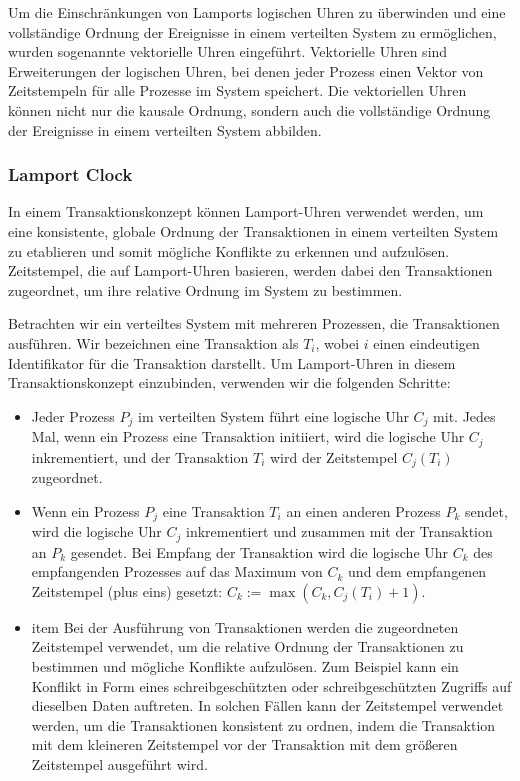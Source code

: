 Um die Einschränkungen von Lamports logischen Uhren zu überwinden und eine vollständige Ordnung der Ereignisse in einem verteilten System zu ermöglichen, wurden sogenannte vektorielle Uhren eingeführt. Vektorielle Uhren sind Erweiterungen der logischen Uhren, bei denen jeder Prozess einen Vektor von Zeitstempeln für alle Prozesse im System speichert. Die vektoriellen Uhren können nicht nur die kausale Ordnung, sondern auch die vollständige Ordnung der Ereignisse in einem verteilten System abbilden.

\subsubsection{Lamport Clock}
In einem Transaktionskonzept können Lamport-Uhren verwendet werden, um eine konsistente, globale Ordnung der Transaktionen in einem verteilten System zu etablieren und somit mögliche Konflikte zu erkennen und aufzulösen. Zeitstempel, die auf Lamport-Uhren basieren, werden dabei den Transaktionen zugeordnet, um ihre relative Ordnung im System zu bestimmen.

Betrachten wir ein verteiltes System mit mehreren Prozessen, die Transaktionen ausführen. Wir bezeichnen eine Transaktion als $T_i$, wobei $i$ einen eindeutigen Identifikator für die Transaktion darstellt. Um Lamport-Uhren in diesem Transaktionskonzept einzubinden, verwenden wir die folgenden Schritte:
\begin{itemize}
\item Jeder Prozess $P_j$ im verteilten System führt eine logische Uhr $C_j$ mit. Jedes Mal, wenn ein Prozess eine Transaktion initiiert, wird die logische Uhr $C_j$ inkrementiert, und der Transaktion $T_i$ wird der Zeitstempel $C_j(T_i)$ zugeordnet.

\item Wenn ein Prozess $P_j$ eine Transaktion $T_i$ an einen anderen Prozess $P_k$ sendet, wird die logische Uhr $C_j$ inkrementiert und zusammen mit der Transaktion an $P_k$ gesendet. Bei Empfang der Transaktion wird die logische Uhr $C_k$ des empfangenden Prozesses auf das Maximum von $C_k$ und dem empfangenen Zeitstempel (plus eins) gesetzt: $C_k := \max(C_k, C_j(T_i) + 1)$.

\item item Bei der Ausführung von Transaktionen werden die zugeordneten Zeitstempel verwendet, um die relative Ordnung der Transaktionen zu bestimmen und mögliche Konflikte aufzulösen. Zum Beispiel kann ein Konflikt in Form eines schreibgeschützten oder schreibgeschützten Zugriffs auf dieselben Daten auftreten. In solchen Fällen kann der Zeitstempel verwendet werden, um die Transaktionen konsistent zu ordnen, indem die Transaktion mit dem kleineren Zeitstempel vor der Transaktion mit dem größeren Zeitstempel ausgeführt wird.
\end{itemize}

